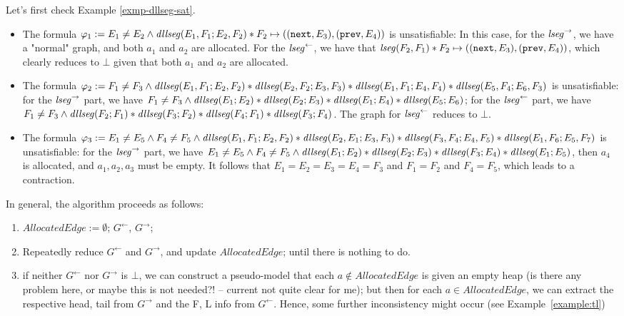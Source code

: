 \documentclass{llncs}
\begin{document}
Let's first check Example \ref{exmp-dllseg-sat}.  
\begin{itemize}
\item The formula $\varphi_1:= E_1 \neq E_2 \wedge \mathit{dllseg}(E_1,F_1; E_2, F_2) \ast F_2 \mapsto ((\mathtt{next},E_3),(\mathtt{prev},E_4))$ is unsatisfiable: In this case, for the $\mathit{lseg}^{\rightarrow}$, we have a "normal" graph, and both $a_1$ and $a_2$ are allocated. For the $\mathit{lseg}^{\leftarrow}$, we have that $\mathit{lseg}(F_2, F_1)\ast F_2 \mapsto ((\mathtt{next},E_3),(\mathtt{prev},E_4))$, which clearly reduces to $\bot$ given that both $a_1$ and $a_2$ are allocated.

\item The formula $\varphi_2 := F_1 \neq F_3 \wedge \mathit{dllseg}(E_1, F_1; E_2, F_2) \ast  \mathit{dllseg}(E_2, F_2; E_3, F_3) \ast \mathit{dllseg}(E_1, F_1; E_4, F_4) \ast \mathit{dllseg}(E_5, F_4; E_6, F_3)$ is unsatisfiable: for the $\mathit{lseg}^{\rightarrow}$ part, we have $F_1 \neq F_3 \wedge \mathit{dllseg}(E_1 ; E_2) \ast  \mathit{dllseg}(E_2; E_3) \ast \mathit{dllseg}(E_1; E_4) \ast \mathit{dllseg}(E_5; E_6)$; for the $\mathit{lseg}^{\leftarrow}$ part, we have $F_1 \neq F_3 \wedge \mathit{dllseg}(F_2; F_1) \ast  \mathit{dllseg}(F_3;  F_2) \ast \mathit{dllseg}(F_4; F_1) \ast \mathit{dllseg}(F_3; F_4)$. The graph for $\mathit{lseg}^{\leftarrow}$ reduces to $\bot$. 
 
%
\item The formula $\varphi_3 := E_1 \neq E_5 \wedge F_4 \neq F_5 \wedge \mathit{dllseg}(E_1, F_1; E_2, F_2) \ast \mathit{dllseg}(E_2, E_1; E_3, F_3) \ast \mathit{dllseg}(F_3, F_4; E_4, F_5) \ast \mathit{dllseg}(E_1, F_6; E_5, F_7)$ is unsatisfiable: for the $\mathit{lseg}^{\rightarrow}$ part, we have $ E_1 \neq E_5 \wedge F_4 \neq F_5 \wedge \mathit{dllseg}(E_1; E_2) \ast \mathit{dllseg}(E_2; E_3) \ast \mathit{dllseg}(F_3; E_4) \ast \mathit{dllseg}(E_1; E_5)$, then $a_4$ is allocated, and $a_1, a_2, a_3$ must be empty. It follows that $E_1=E_2=E_3=E_4=F_3$ and $F_1=F_2$ and $F_4=F_5$, which leads to a contraction. 
 
\end{itemize}
 
In general, the algorithm proceeds as follows:
\begin{enumerate}
\item $AllocatedEdge:=\emptyset$; $G^{\leftarrow}$, $G^{\rightarrow}$;

\item Repeatedly reduce $G^{\leftarrow}$ and $G^{\rightarrow}$, and update $AllocatedEdge$;
until there is nothing to do.

\item if neither $G^{\leftarrow}$ nor $G^{\rightarrow}$ is $\bot$, we can construct a pseudo-model that each $a\notin  AllocatedEdge$ is given an empty heap (is there any problem here, or maybe this is not needed?! -- current not quite clear for me); but then for each $a\in AllocatedEdge$, we can extract the respective head, tail from $G^\rightarrow$ and the F, L info from $G^{\leftarrow}$. Hence, some further inconsistency might occur (see Example~\ref{example:tl})

\end{enumerate}
\end{document}
